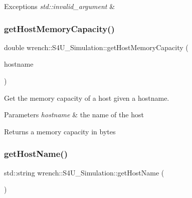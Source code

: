 \begin{DoxyExceptions}{Exceptions}
{\em std\+::invalid\+\_\+argument} & \\
\hline
\end{DoxyExceptions}
\mbox{\label{classwrench_1_1_s4_u___simulation_a5619ac678a185fd7031d6f13d7ec463a}} 
\subsubsection{\texorpdfstring{get\+Host\+Memory\+Capacity()}{getHostMemoryCapacity()}}
{\footnotesize\ttfamily double wrench\+::\+S4\+U\+\_\+\+Simulation\+::get\+Host\+Memory\+Capacity (\begin{DoxyParamCaption}\item[{std\+::string}]{hostname }\end{DoxyParamCaption})\hspace{0.3cm}{\ttfamily [static]}}



Get the memory capacity of a host given a hostname. 


\begin{DoxyParams}{Parameters}
{\em hostname} & the name of the host \\
\hline
\end{DoxyParams}
\begin{DoxyReturn}{Returns}
a memory capacity in bytes 
\end{DoxyReturn}
\mbox{\label{classwrench_1_1_s4_u___simulation_aa79d6550a2d924c37f6f58533d15518e}} 
\subsubsection{\texorpdfstring{get\+Host\+Name()}{getHostName()}}
{\footnotesize\ttfamily std\+::string wrench\+::\+S4\+U\+\_\+\+Simulation\+::get\+Host\+Name (\begin{DoxyParamCaption}{ }\end{DoxyParamCaption})\hspace{0.3cm}{\ttfamily [static]}}



